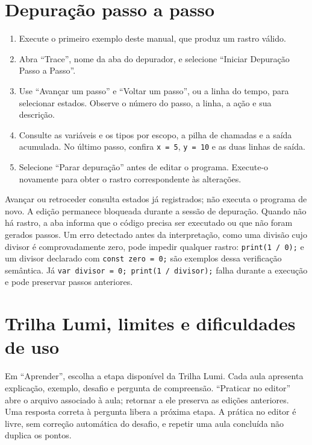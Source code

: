 \section*{Depuração passo a passo}

\begin{enumerate}
    \item Execute o primeiro exemplo deste manual, que produz um rastro válido.
    \item Abra ``Trace'', nome da aba do depurador, e selecione
    ``Iniciar Depuração Passo a Passo''.
    \item Use ``Avançar um passo'' e ``Voltar um passo'', ou a linha do tempo,
    para selecionar estados. Observe o número do passo, a linha, a ação e sua
    descrição.
    \item Consulte as variáveis e os tipos por escopo, a pilha de chamadas e a
    saída acumulada. No último passo, confira \texttt{x = 5}, \texttt{y = 10}
    e as duas linhas de saída.
    \item Selecione ``Parar depuração'' antes de editar o programa. Execute-o
    novamente para obter o rastro correspondente às alterações.
\end{enumerate}

Avançar ou retroceder consulta estados já registrados; não executa o programa
de novo. A edição permanece bloqueada durante a sessão de depuração. Quando não
há rastro, a aba informa que o código precisa ser executado ou que não foram
gerados passos. Um erro detectado antes da interpretação, como uma divisão cujo
divisor é comprovadamente zero, pode impedir qualquer rastro: \texttt{print(1 / 0);} e um divisor declarado com \texttt{const zero = 0;} são exemplos dessa verificação semântica. Já \texttt{var divisor = 0; print(1 / divisor);} falha durante a execução e pode preservar passos anteriores.

\section*{Trilha Lumi, limites e dificuldades de uso}

Em ``Aprender'', escolha a etapa disponível da Trilha Lumi. Cada aula apresenta
explicação, exemplo, desafio e pergunta de compreensão. ``Praticar no editor''
abre o arquivo associado à aula; retornar a ele preserva as edições anteriores.
Uma resposta correta à pergunta libera a próxima etapa. A prática no editor é
livre, sem correção automática do desafio, e repetir uma aula concluída não
duplica os pontos.


